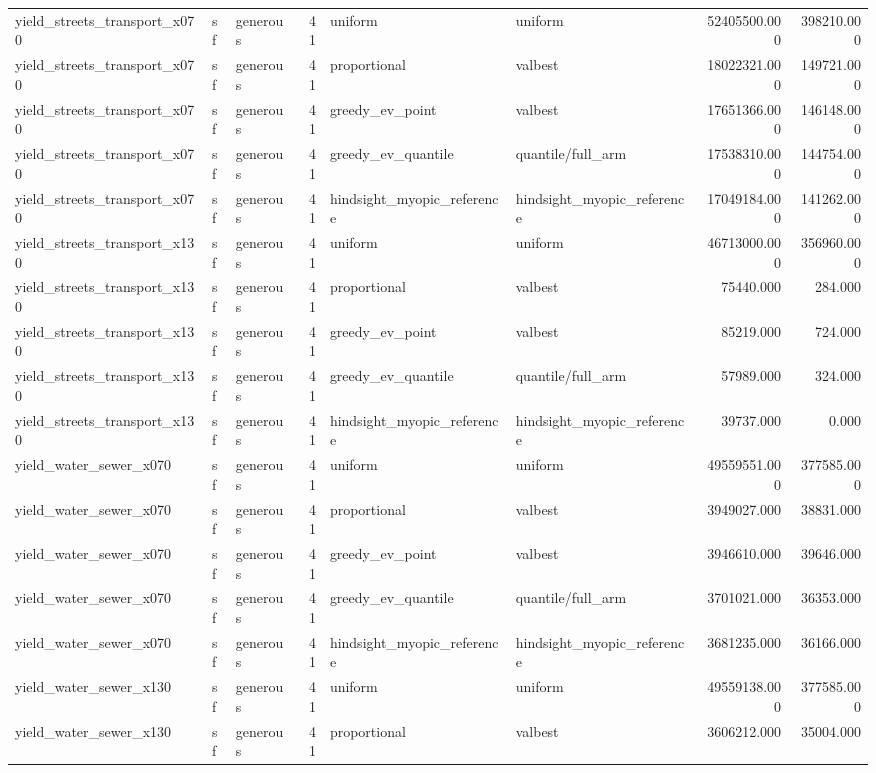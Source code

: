 \begin{tabular}{lllrllrr}
yield\_streets\_transport\_x070 & sf & generous & 41 & uniform & uniform & 52405500.000 & 398210.000 \\
yield\_streets\_transport\_x070 & sf & generous & 41 & proportional & valbest & 18022321.000 & 149721.000 \\
yield\_streets\_transport\_x070 & sf & generous & 41 & greedy\_ev\_point & valbest & 17651366.000 & 146148.000 \\
yield\_streets\_transport\_x070 & sf & generous & 41 & greedy\_ev\_quantile & quantile/full\_arm & 17538310.000 & 144754.000 \\
yield\_streets\_transport\_x070 & sf & generous & 41 & hindsight\_myopic\_reference & hindsight\_myopic\_reference & 17049184.000 & 141262.000 \\
yield\_streets\_transport\_x130 & sf & generous & 41 & uniform & uniform & 46713000.000 & 356960.000 \\
yield\_streets\_transport\_x130 & sf & generous & 41 & proportional & valbest & 75440.000 & 284.000 \\
yield\_streets\_transport\_x130 & sf & generous & 41 & greedy\_ev\_point & valbest & 85219.000 & 724.000 \\
yield\_streets\_transport\_x130 & sf & generous & 41 & greedy\_ev\_quantile & quantile/full\_arm & 57989.000 & 324.000 \\
yield\_streets\_transport\_x130 & sf & generous & 41 & hindsight\_myopic\_reference & hindsight\_myopic\_reference & 39737.000 & 0.000 \\
yield\_water\_sewer\_x070 & sf & generous & 41 & uniform & uniform & 49559551.000 & 377585.000 \\
yield\_water\_sewer\_x070 & sf & generous & 41 & proportional & valbest & 3949027.000 & 38831.000 \\
yield\_water\_sewer\_x070 & sf & generous & 41 & greedy\_ev\_point & valbest & 3946610.000 & 39646.000 \\
yield\_water\_sewer\_x070 & sf & generous & 41 & greedy\_ev\_quantile & quantile/full\_arm & 3701021.000 & 36353.000 \\
yield\_water\_sewer\_x070 & sf & generous & 41 & hindsight\_myopic\_reference & hindsight\_myopic\_reference & 3681235.000 & 36166.000 \\
yield\_water\_sewer\_x130 & sf & generous & 41 & uniform & uniform & 49559138.000 & 377585.000 \\
yield\_water\_sewer\_x130 & sf & generous & 41 & proportional & valbest & 3606212.000 & 35004.000 \\

\end{tabular}
